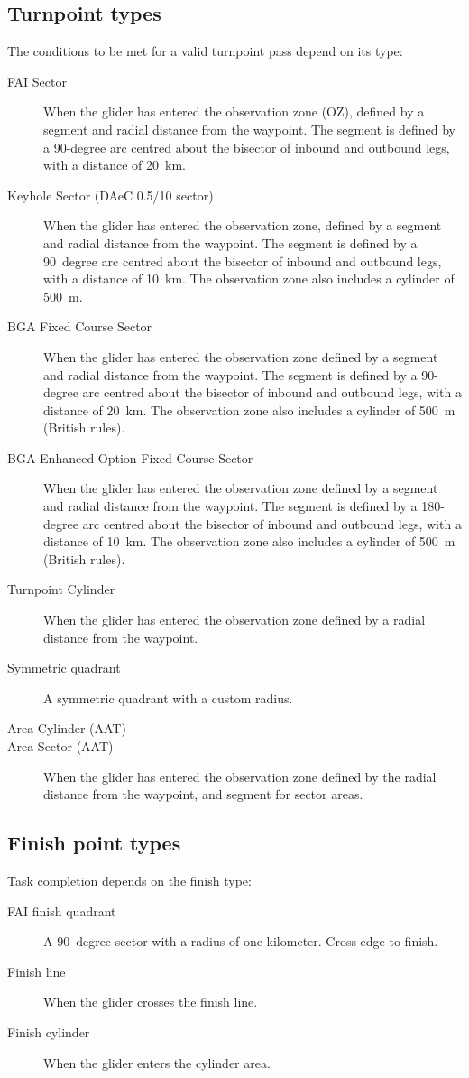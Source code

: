 \subsection*{Turnpoint types}
The conditions to be met for a valid turnpoint pass depend on its
 type:
\begin{description}
\item[FAI Sector] When the glider has entered the observation zone (OZ), defined 
by a segment and radial distance from the waypoint.  The segment is
defined by a 90-degree arc centred about the bisector of inbound and
outbound legs, with a distance of 20~km.
\item[Keyhole Sector (DAeC 0.5/10 sector)] When the glider has entered the
observation zone, defined by a segment and radial distance from the waypoint.  The segment is
defined by a 90~degree arc centred about the bisector of inbound and
outbound legs, with a distance of 10~km.  The observation zone also includes
a cylinder of 500~m.
\item[BGA Fixed Course Sector]  When the glider has entered the
observation zone defined by a segment and radial distance from the
waypoint. The segment is defined by a 90-degree arc centred about the
bisector of inbound and outbound legs, with a distance of 20~km.
The observation zone also includes a cylinder of 500~m (British rules).
\item[BGA Enhanced Option Fixed Course Sector]  When the glider has entered the
observation zone defined by a segment and radial distance from the
waypoint. The segment is defined by a 180-degree arc centred about the
bisector of inbound and outbound legs, with a distance of 10~km.
The observation zone also includes a cylinder of 500~m (British rules).
\item[Turnpoint Cylinder]  When the glider has entered the observation zone
defined by a radial distance from the waypoint.
\item[Symmetric quadrant] A symmetric quadrant with a custom radius.
\item[Area Cylinder (AAT)] %
\item[Area Sector (AAT)]  When the glider has entered the observation zone
defined by the radial distance from the waypoint, and segment for sector areas.
\end{description}

\subsection*{Finish point types}
Task completion depends on the finish type:
\begin{description}
\item[FAI finish quadrant] A 90~degree sector with a radius of one kilometer. Cross edge to finish.
\item[Finish line] When the glider crosses the finish line.
\item[Finish cylinder] When the glider enters the cylinder area.
\end{description}

